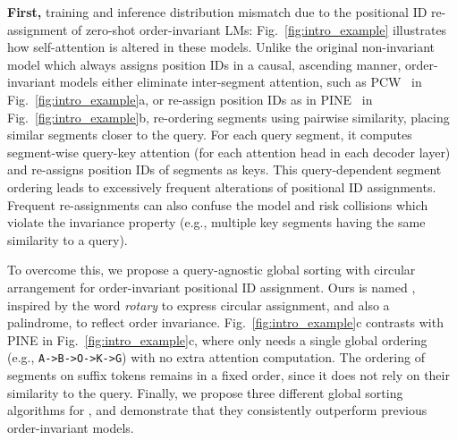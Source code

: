 \textbf{First,} training and inference distribution mismatch due to the positional ID re-assignment of zero-shot order-invariant LMs: Fig.~\ref{fig:intro_example} illustrates how self-attention is altered in these models. Unlike the original non-invariant model which always assigns position IDs in a causal, ascending manner, order-invariant models either eliminate inter-segment attention, such as PCW~\cite{pcw} in Fig.~\ref{fig:intro_example}a,
or re-assign position IDs
as in
PINE~\cite{pine} in
Fig.~\ref{fig:intro_example}b,
 re-ordering segments using pairwise similarity, placing similar segments closer to the query. For each query segment, it computes segment-wise query-key attention (for each attention head in each decoder layer) and re-assigns position IDs of segments as keys. This query-dependent segment ordering leads to excessively frequent alterations of positional ID assignments. 
 Frequent re-assignments can also confuse the model and risk collisions which violate the invariance property (e.g., multiple key segments having the same similarity to a query). 

To overcome this, we propose a query-agnostic global sorting with circular arrangement for order-invariant positional ID assignment.
Ours is named \textbf{\ours{}}, inspired by the word \textit{rotary} to express circular assignment, and also a palindrome, to reflect order invariance.
Fig.~\ref{fig:intro_example}c contrasts with
 PINE in Fig.~\ref{fig:intro_example}c, where \ours{} only needs a single global ordering (e.g., \texttt{A->B->O->K->G}) with no extra attention computation. The ordering of segments on suffix tokens remains in a fixed order, since it does not rely on their similarity to the query. %
Finally, we propose three different global sorting algorithms for \ours{}, and demonstrate that they consistently outperform previous order-invariant models.

